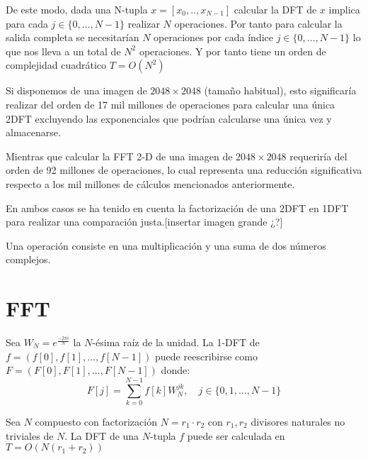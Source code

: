 \noindent De este modo, dada una N-tupla $x = [x_0,..,x_{N-1}]$ calcular la DFT  de $x$ implica para cada  $j \in \{0,...,N-1\}$ realizar $N$ operaciones.
Por tanto para calcular la salida completa se necesitarían $N$ operaciones por cada índice $j \in \{0,...,N-1\}$ lo que nos lleva a un total de $N^2$ operaciones.
Y por tanto tiene un orden de complejidad cuadrático $T = O(N^2)$
\begin{ejemplo}
\noindent Si disponemos de una imagen de $2048 \times 2048$ (tamaño habitual), esto significaría realizar del orden de 17 mil millones de operaciones para calcular una única 2DFT excluyendo las exponenciales que podrían calcularse una única vez y almacenarse.

\noindent  Mientras que calcular la FFT 2-D de una imagen de $2048 \times 2048$ requeriría del orden de 92 millones de operaciones, lo cual representa una reducción significativa respecto a los mil millones de cálculos mencionados anteriormente. 
\begin{observacion}
  \noindent En ambos casos se ha tenido en cuenta la factorización de una 2DFT en 1DFT para realizar una comparación justa.[insertar imagen grande ¿?]
\end{observacion}
\end{ejemplo}

\begin{observacion}
    Una operación consiste en una multiplicación y una suma de dos números complejos.
\end{observacion}

\section{FFT}
Sea $W_N = e^{\frac{-2\pi i}{N}}$ la $N$-ésima raíz de la unidad. 
La 1-DFT de $f = (f[0],f[1],\ldots,f[N-1])$ puede reescribirse como $F = (F[0],F[1],\ldots,F[N-1])$ donde:
\begin{equation}\label{}
    F[j] = \sum_{k=0}^{N-1} f[k] W_{N}^{jk}, \quad j \in \{0,1,\ldots,N-1\}
\end{equation}


\begin{teorema}
Sea  $N$  compuesto con factorización $N = r_1 \cdot r_2$ con $r_1,r_2$ divisores naturales no triviales de $N$.
La DFT de una $N$-tupla $f$  puede ser calculada en $T=O(N(r_1+r_2))$ 
\end{teorema}


\vspace{0.2cm}


